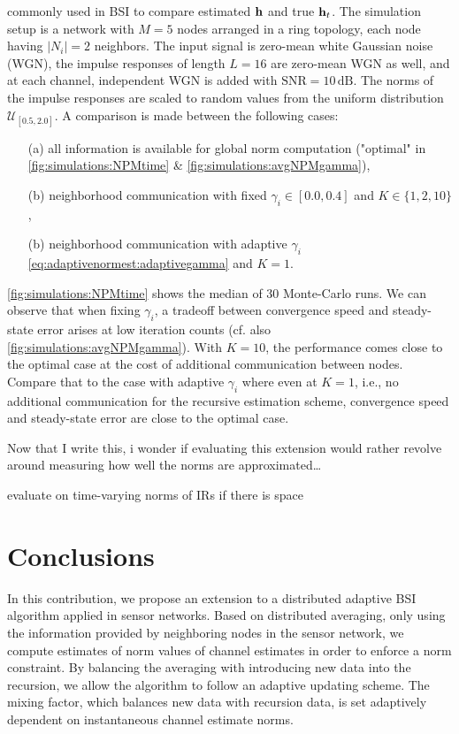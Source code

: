 \documentclass{article}
\begin{document}
commonly used in BSI to compare estimated \(\bm{\mathrm{h}}\) and true \(\bm{\mathrm{h}}_t\).
The simulation setup is a network with \(M=5\) nodes arranged in a ring topology, each node having \(|N_i|=2\) neighbors.
The input signal is zero-mean white Gaussian noise (WGN), the impulse responses of length \(L=16\) are zero-mean WGN as well, and at each channel, independent WGN is added with \(\text{SNR}=10\,\text{dB}\).
The norms of the impulse responses are scaled to random values from the uniform distribution \(\mathcal{U}_{[0.5,2.0]}\).
A comparison is made between the following cases:
\begin{itemize}
    \itemsep-0.2em
    \item[(a)] all information is available for global norm computation ("optimal" in \autoref{fig:simulations:NPMtime} \& \autoref{fig:simulations:avgNPMgamma}),
    \item[(b)] neighborhood communication with fixed \(\gamma_i \in [0.0, 0.4]\) and \(K \in \{1,2,10\}\),
    \item[(b)] neighborhood communication with adaptive \(\gamma_i\) \eqref{eq:adaptivenormest:adaptivegamma} and \(K=1\).
\end{itemize}
\autoref{fig:simulations:NPMtime} shows the median of 30 Monte-Carlo runs.
We can observe that when fixing \(\gamma_i\), a tradeoff between convergence speed and steady-state error arises at low iteration counts (cf. also \autoref{fig:simulations:avgNPMgamma}).
With \(K=10\), the performance comes close to the optimal case at the cost of additional communication between nodes.
Compare that to the case with adaptive \(\gamma_i\) where even at \(K=1\), i.e., no additional communication for the recursive estimation scheme, convergence speed and steady-state error are close to the optimal case.


\begin{todo}
    Now that I write this, i wonder if evaluating this extension would rather revolve around measuring how well the norms are approximated\dots
\end{todo}
\begin{todo}
    evaluate on time-varying norms of IRs if there is space
\end{todo}

\section[]{Conclusions}
\label{sec:conclusions}
In this contribution, we propose an extension to a distributed adaptive BSI algorithm applied in sensor networks.
Based on distributed averaging, only using the information provided by neighboring nodes in the sensor network, we compute estimates of norm values of channel estimates in order to enforce a norm constraint.
By balancing the averaging with introducing new data into the recursion, we allow the algorithm to follow an adaptive updating scheme.
The mixing factor, which balances new data with recursion data, is set adaptively dependent on instantaneous channel estimate norms.
\end{document}
